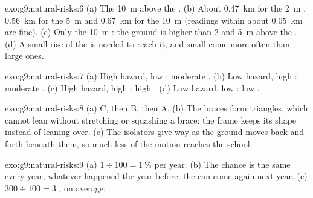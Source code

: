 \begin{solution}{exo:g9:natural-risks:6}
(a) The  \qty{10}{m} above the . (b) About \qty{0.47}{km} for
the \qty{2}{m} , \qty{0.56}{km} for the \qty{5}{m}  and
\qty{0.67}{km} for the \qty{10}{m}  (readings within about
\qty{0.05}{km} are fine). (c) Only the \qty{10}{m} : the ground is
higher than 2 and \qty{5}{m} above the . (d) A small rise of the
 is needed to reach it, and small  come more often than large
ones.
\end{solution}

\begin{solution}{exo:g9:natural-risks:7}
(a) High hazard, low : moderate . (b) Low hazard, high
: moderate . (c) High hazard, high : high
. (d) Low hazard, low : low .
\end{solution}

\begin{solution}{exo:g9:natural-risks:8}
(a) C, then B, then A. (b) The braces form triangles, which cannot lean
without stretching or squashing a brace: the frame keeps its shape
instead of leaning over. (c) The isolators give way as the ground moves
back and forth beneath them, so much less of the motion reaches the
school.
\end{solution}

\begin{solution}{exo:g9:natural-risks:9}
(a) $1 \div 100 = 1~\%$ per year. (b) The chance is the same every year,
whatever happened the year before: the  can come again next year.
(c) $300 \div 100 = 3$ , on average.
\end{solution}


